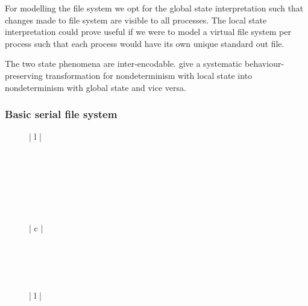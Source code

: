 \documentclass[12pt,phd,lfcs,twoside,openright,logo,leftchapter,normalheadings]{infthesis}
\theoremstyle{plain}
\theoremstyle{definition}
\begin{document}
For modelling the file system we opt for the global state
interpretation such that changes made to file system are visible to
all processes. The local state interpretation could prove useful if we
were to model a virtual file system per process such that each process
would have its own unique standard out file.

The two state phenomena are inter-encodable. \citet{PauwelsSM19} give
a systematic behaviour-preserving transformation for nondeterminism
with local state into nondeterminism with global state and vice versa.


\subsubsection{Basic serial file system}
%
\begin{figure}[t]
  \centering
  \begin{tabular}[t]{| l |}
    \hline
     \\
    \hline
    \\
    \hline
    \\
    \hline
    \\
    \hline
    \\
    \hline
    \\
    \hline
    \\
    \hline
  \end{tabular}
  \hspace{1.5cm}
  \begin{tabular}[t]{| c |}
    \hline
     \\
    \\
    \\
    \hline
    \\
    \\
    \hline
  \end{tabular}
  \hspace{1.5cm}
  \begin{tabular}[t]{| l |}
    \hline
     \\
    \hline
    \strlit{}\\
    \hline

\end{tabular}
\end{figure}
\end{document}
